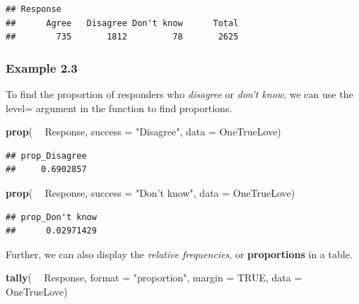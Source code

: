 \documentclass[]{book}
\newenvironment{Shaded}{\begin{snugshade}}{\end{snugshade}}
\newcommand{\DataTypeTok}[1]{\textcolor[rgb]{0.13,0.29,0.53}{#1}}
\newcommand{\KeywordTok}[1]{\textcolor[rgb]{0.13,0.29,0.53}{\textbf{#1}}}
\newcommand{\NormalTok}[1]{#1}
\newcommand{\OperatorTok}[1]{\textcolor[rgb]{0.81,0.36,0.00}{\textbf{#1}}}
\newcommand{\OtherTok}[1]{\textcolor[rgb]{0.56,0.35,0.01}{#1}}
\newcommand{\StringTok}[1]{\textcolor[rgb]{0.31,0.60,0.02}{#1}}
\begin{document}
\begin{verbatim}
## Response
##      Agree   Disagree Don't know      Total 
##        735       1812         78       2625
\end{verbatim}

\hypertarget{example-2.3}{%
\subsubsection{Example 2.3}\label{example-2.3}}

To find the proportion of responders who \emph{disagree} or \emph{don't know}, we can use the {level=} argument in the function to find proportions.

\begin{Shaded}
\begin{Highlighting}[]
\KeywordTok{prop}\NormalTok{( }\OperatorTok{~}\StringTok{ }\NormalTok{Response, }\DataTypeTok{success =} \StringTok{"Disagree"}\NormalTok{, }\DataTypeTok{data =}\NormalTok{ OneTrueLove)}
\end{Highlighting}
\end{Shaded}

\begin{verbatim}
## prop_Disagree 
##     0.6902857
\end{verbatim}

\begin{Shaded}
\begin{Highlighting}[]
\KeywordTok{prop}\NormalTok{( }\OperatorTok{~}\StringTok{ }\NormalTok{Response, }\DataTypeTok{success =} \StringTok{"Don't know"}\NormalTok{, }\DataTypeTok{data =}\NormalTok{ OneTrueLove)}
\end{Highlighting}
\end{Shaded}

\begin{verbatim}
## prop_Don't know 
##      0.02971429
\end{verbatim}

Further, we can also display the \emph{relative frequencies}, or \textbf{proportions} in a table.

\begin{Shaded}
\begin{Highlighting}[]
\KeywordTok{tally}\NormalTok{( }\OperatorTok{~}\StringTok{ }\NormalTok{Response, }\DataTypeTok{format =} \StringTok{"proportion"}\NormalTok{, }\DataTypeTok{margin =} \OtherTok{TRUE}\NormalTok{, }\DataTypeTok{data =}\NormalTok{ OneTrueLove)}
\end{Highlighting}
\end{Shaded}
\end{document}
